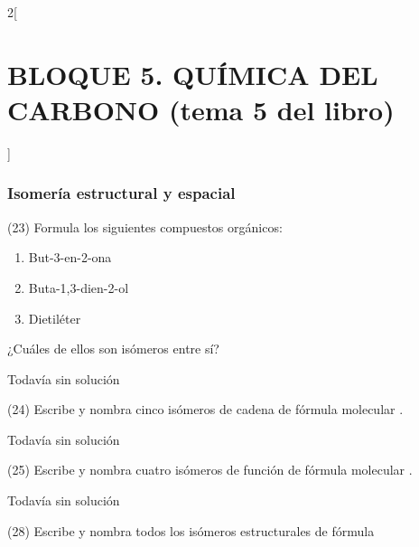 \documentclass[10pt]{article}
\begin{document}
\begin{multicols}{2}[
  \section{BLOQUE 5. QUÍMICA DEL CARBONO (tema 5 del libro)}
  ]
\subsubsection{Isomería estructural y espacial}

\begin{exercise}[
    tags    = {},
    topics  = {química, química orgánica, orgánica},
    source  = {FQ 1B MGH 2016, p152, e23},
  ]
  (23) Formula los siguientes compuestos orgánicos:
  \begin{enumerate}
    \item But-3-en-2-ona
    \item Buta-1,3-dien-2-ol
    \item Dietiléter
  \end{enumerate}
  ¿Cuáles de ellos son isómeros entre sí?
\end{exercise}

\begin{solution}[print=false]
  Todavía sin solución
\end{solution}




\begin{exercise}[
    tags    = {},
    topics  = {química, química orgánica, orgánica},
    source  = {FQ 1B MGH 2016, p152, e24},
  ]
  (24) Escribe y nombra cinco isómeros de cadena de fórmula molecular .
\end{exercise}

\begin{solution}[print=false]
  Todavía sin solución
\end{solution}




\begin{exercise}[
    tags    = {},
    topics  = {química, química orgánica, orgánica},
    source  = {FQ 1B MGH 2016, p152, e25},
  ]
  (25) Escribe y nombra cuatro isómeros de función de fórmula molecular .
\end{exercise}

\begin{solution}[print=false]
  Todavía sin solución
\end{solution}




\begin{exercise}[
    tags    = {},
    topics  = {química, química orgánica, orgánica},
    source  = {FQ 1B MGH 2016, p152, e28},
  ]
  (28) Escribe y nombra todos los isómeros estructurales de fórmula 
\end{exercise}


\end{multicols}
\end{document}
